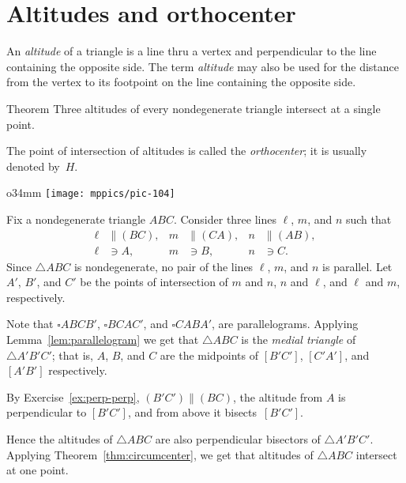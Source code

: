 \section{Altitudes and orthocenter}

An \emph{altitude} of a triangle is a line thru a vertex and perpendicular to the line containing the opposite side.
The term \emph{altitude} may also be used for the distance from the vertex to its footpoint on the line containing the opposite side.

\begin{thm}{Theorem}\label{thm:orthocenter}
Three altitudes of every nondegenerate triangle intersect at a single point.
\end{thm}

The point of intersection of altitudes is called the \emph{orthocenter}; 
it is usually denoted by~$H$.

{

\begin{wrapfigure}{o}{34mm}
\vskip-4mm
\centering
\texttt{[image: mppics/pic-104]}
\end{wrapfigure}

Fix a nondegenerate triangle $A B C$.
Consider three lines $\ell$, $m$, and $n$
such that 
\begin{align*}
\ell&\parallel(BC),
&
m&\parallel(CA),
&
n&\parallel(AB),
\\
\ell&\ni A,
&
m&\ni B,
&
n&\ni C.
\end{align*}
Since $\triangle A B C$ is nondegenerate,
no pair of the lines $\ell$, $m$, and $n$ is parallel.
Let $A'$, $B'$, and $C'$ be the points of intersection of
$m$ and $n$, $n$ and $\ell$, and $\ell$ and $m$, respectively.

}

Note that $\square A B C B'$, $\square B C A C'$, and $\square C A B A'$, are parallelograms.
Applying Lemma~\ref{lem:parallelogram} we get that $\triangle ABC$ is the \emph{medial triangle} of $\triangle A' B' C'$;
that is, $A$, $B$, and $C$ are the midpoints of $[B' C']$, $[C' A']$, and $[A' B']$ respectively.

By Exercise~\ref{ex:perp-perp},
$(B' C')\parallel (BC)$,
the altitude from $A$ is perpendicular to $[B' C']$, 
and from above it bisects~$[B' C']$.

Hence the altitudes of $\triangle A B C$ 
are also perpendicular bisectors of $\triangle A' B' C'$.
Applying Theorem~\ref{thm:circumcenter}, we get that altitudes of $\triangle ABC$ intersect at one point.
\qeds

